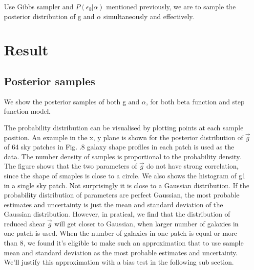 \documentclass[useAMS,usenatbib]{mn2e}
\begin{document}
Use Gibbs sampler and $P(\epsilon_{0}|\alpha)$ mentioned previously, we
are to sample the posterior distribution of g and $\alpha$ simultaneously
and effectively.




\section{Result}

\label{sec:XXX}


\subsection{Posterior samples}

We show the posterior samples of both g and $\alpha$, for both beta
function and step function model. 

The probability distribution can be visualised by plotting points at each sample
position. An example in the x, y plane is shown for the posterior distribution of
$\vec{g}$ of 64 sky patches in Fig. .8 galaxy shape profiles in each patch is used as the data.
The number density of samples is proportional to the probability density. The figure shows that the two parameters of $\vec{g}$
do not have strong correlation, since the shape of smaples is close to a circle.
We also shows the histogram of g1 in a single sky patch. Not surprisingly it is close to a Gaussian distribution.
If the probability distribution of parameters are perfect Gaussian, the most probable estimates and uncertainty 
is just the mean and standard deviation of the Gaussian distribution. However, in pratical, we find that the distribution 
of reduced shear $\vec{g}$ will  get closer to Gaussian, when larger number of galaxies in one patch  is used. When the number of galaxies in 
one patch is equal or more than 8, we found it's eligible to make such an approximation that to use sample mean and standard 
deviation as the most probable estimates and uncertainty. We'll justify this approximation with a bias test in the following
sub section.
\end{document}
